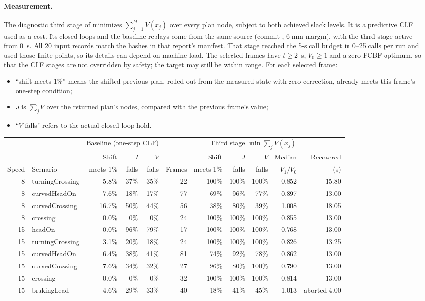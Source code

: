 \documentclass[11pt]{article}
\begin{document}
\paragraph{Measurement.} The diagnostic third stage of
 minimizes $\sum_{j=1}^{M}V(x_j)$ over
every plan node, subject to both achieved slack levels. It is a predictive CLF
used as a cost. Its closed loops and the baseline replays come from the same
source (commit , 6-mm margin), with the third stage active from
0~s. All 20 input records match the hashes in that report's manifest. That
stage reached the 5-s call budget in 0--25 calls per run and used those finite
points, so its details can depend on machine load. The
selected frames have $t\ge2$~s, $V_0\ge1$ and a zero PCBF optimum, so that the
CLF stages are not overridden by safety; the target may still be within range.
For each selected frame:
\begin{itemize}
\item ``shift meets 1\%'' means the shifted previous plan, rolled out from the
measured state with zero correction, already meets this frame's one-step
condition;
\item $J$ is $\sum_jV$ over the returned plan's nodes, compared with the
previous frame's value;
\item ``$V$ falls'' refers to the actual closed-loop hold.
\end{itemize}
\begin{center}\footnotesize
\begin{tabular}{rlrrrrrrrrr}
\toprule
 & & \multicolumn{3}{c}{Baseline (one-step CLF)} & \multicolumn{6}{c}{Third stage $\min\sum_jV(x_j)$}\\
 & & Shift & $J$ & $V$ & & Shift & $J$ & $V$ & Median & Recovered\\
Speed & Scenario & meets 1\% & falls & falls & Frames & meets 1\% & falls & falls & $V_1/V_0$ & (s)\\
\midrule
8 & turningCrossing & 5.8\% & 37\% & 35\% & 22 & 100\% & 100\% & 100\% & 0.852 & 15.80\\
8 & curvedHeadOn & 7.6\% & 18\% & 17\% & 77 & 69\% & 96\% & 77\% & 0.897 & 13.00\\
8 & curvedCrossing & 16.7\% & 50\% & 44\% & 56 & 38\% & 80\% & 39\% & 1.008 & 18.05\\
8 & crossing & 0.0\% & 0\% & 0\% & 24 & 100\% & 100\% & 100\% & 0.855 & 13.00\\
15 & headOn & 0.0\% & 96\% & 79\% & 17 & 100\% & 100\% & 100\% & 0.768 & 13.00\\
15 & turningCrossing & 3.1\% & 20\% & 18\% & 24 & 100\% & 100\% & 100\% & 0.826 & 13.25\\
15 & curvedHeadOn & 6.4\% & 38\% & 41\% & 81 & 74\% & 92\% & 78\% & 0.862 & 13.00\\
15 & curvedCrossing & 7.6\% & 34\% & 32\% & 27 & 96\% & 80\% & 100\% & 0.790 & 13.00\\
15 & crossing & 0.0\% & 0\% & 0\% & 32 & 100\% & 100\% & 100\% & 0.814 & 13.00\\
15 & brakingLead & 4.6\% & 29\% & 33\% & 40 & 18\% & 41\% & 45\% & 1.013 & aborted 4.00\\
\bottomrule
\end{tabular}\end{center}
\end{document}

